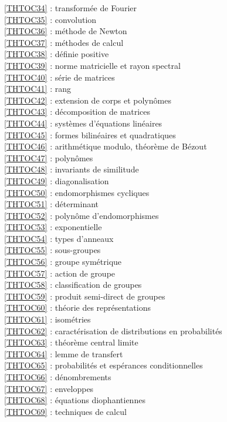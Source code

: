 \ref {THTOC34} : transformée de Fourier\\
\ref {THTOC35} : convolution\\
\ref {THTOC36} : méthode de Newton\\
\ref {THTOC37} : méthodes de calcul\\
\ref {THTOC38} : définie positive\\
\ref {THTOC39} : norme matricielle et rayon spectral\\
\ref {THTOC40} : série de matrices\\
\ref {THTOC41} : rang\\
\ref {THTOC42} : extension de corps et polynômes\\
\ref {THTOC43} : décomposition de matrices\\
\ref {THTOC44} : systèmes d'équations linéaires\\
\ref {THTOC45} : formes bilinéaires et quadratiques\\
\ref {THTOC46} : arithmétique modulo, théorème de Bézout\\
\ref {THTOC47} : polynômes\\
\ref {THTOC48} : invariants de similitude\\
\ref {THTOC49} : diagonalisation\\
\ref {THTOC50} : endomorphismes cycliques\\
\ref {THTOC51} : déterminant\\
\ref {THTOC52} : polynôme d'endomorphismes\\
\ref {THTOC53} : exponentielle\\
\ref {THTOC54} : types d'anneaux\\
\ref {THTOC55} : sous-groupes\\
\ref {THTOC56} : groupe symétrique\\
\ref {THTOC57} : action de groupe\\
\ref {THTOC58} : classification de groupes\\
\ref {THTOC59} : produit semi-direct de groupes\\
\ref {THTOC60} : théorie des représentations\\
\ref {THTOC61} : isométries\\
\ref {THTOC62} : caractérisation de distributions en probabilités\\
\ref {THTOC63} : théorème central limite\\
\ref {THTOC64} : lemme de transfert\\
\ref {THTOC65} : probabilités et espérances conditionnelles\\
\ref {THTOC66} : dénombrements\\
\ref {THTOC67} : enveloppes\\
\ref {THTOC68} : équations diophantiennes\\
\ref {THTOC69} : techniques de calcul\\
